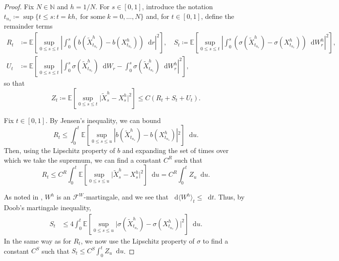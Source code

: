 \documentclass[oneside]{amsart}
\theoremstyle{definition}
\newcommand{\F}{\mathcal F}
\newcommand{\N}{\mathbb N}
\newcommand{\D}{\mathop{}\!\mathrm{d}}
\def\E{{\mathbb E}}
\numberwithin{equation}{section}
\begin{document}
\begin{proof}
	Fix $N \in \N$ and $h = 1/N$. For $s \in [0, 1]$, introduce the notation $t_{n_s}\coloneqq  \sup\{t \leq s \colon t = kh, \; \text{for some}\; k = 0, \dotsc, N\}$ and, for $t \in [0, 1]$, define the remainder terms
	\begin{equation}
	\begin{split}
		R_t &\coloneqq  \E\!\left[\sup_{0 \leq s \leq t} \!\left \lvert \int_{0}^s \!\left(b(\tilde{X}^h_{t_{n_r}}) - b(X^h_{t_{n_r}})\right) \D r \right \rvert^2\right], \quad S_t\coloneqq  \E \!\left[\sup_{0 \leq s \leq t} \!\left \lvert \int_{0}^s \!\left(\sigma(\tilde{X}^h_{t_{n_r}}) - \sigma(X^h_{t_{n_r}})\right)\D W^h_r \right \rvert^2\right],\\
		U_t &\coloneqq  \E \!\left[\sup_{0 \leq s \leq t} \!\left \lvert \int_{0}^s \sigma(\tilde{X}^h_{t_{n_r}})\D W_r - \int_{0}^s\sigma(\tilde{X}^h_{t_{n_r}})\D W^h_r \right \rvert^2\right],
	\end{split}
	\end{equation}
	so that
	\begin{equation}
		Z_t\coloneqq  \E\!\left[\sup_{0 \leq s \leq t} \lvert \tilde{X}^h_s - X^h_s \rvert^2 \right] \leq C(R_t + S_t + U_t).
	\end{equation}	
	
	Fix $t \in [0, 1]$. By Jensen's inequality, we can bound
	\begin{equation}
		R_t \leq \int_0^t \E \!\left[ \sup_{0 \leq s \leq u} \!\left\lvert b(\tilde{X}^h_{t_{n_s}}) - b(X^h_{t_{n_s}}) \right\rvert\!^2\right] \D u.
	\end{equation}
	Then, using the Lipschitz property of $b$ and expanding the set of times over which we take the supremum, we can find a constant $C^R$ such that
	\begin{equation}
		R_t \leq C^R \int_0^t \E\!\left[\sup_{0 \leq s \leq u} \lvert \tilde{X}^h_s - X^h_s  \rvert^2 \right]\D u = C^R \int_0^t Z_u \D u.
	\end{equation}
	
	As noted in , $W^h$ is an $\F^W$-martingale, and we see that $\D \langle W^h\rangle_t \leq \D t$. Thus, by Doob's martingale inequality,
	\begin{equation}
	\begin{split}
		S_t & \leq 4 \int_0^t \E \!\left[ \sup_{0 \leq s \leq u} \lvert \sigma(\tilde{X}^h_{t_{n_s}}) - \sigma(X^h_{t_{n_s}}) \rvert^2\right] \D u.
	\end{split}
	\end{equation}
	In the same way as for $R_t$, we now use the Lipschitz property of $\sigma$ to find a constant $C^S$ such that $S_t \leq C^S \int_0^t Z_u \D u$.
	

\end{proof}
\end{document}
